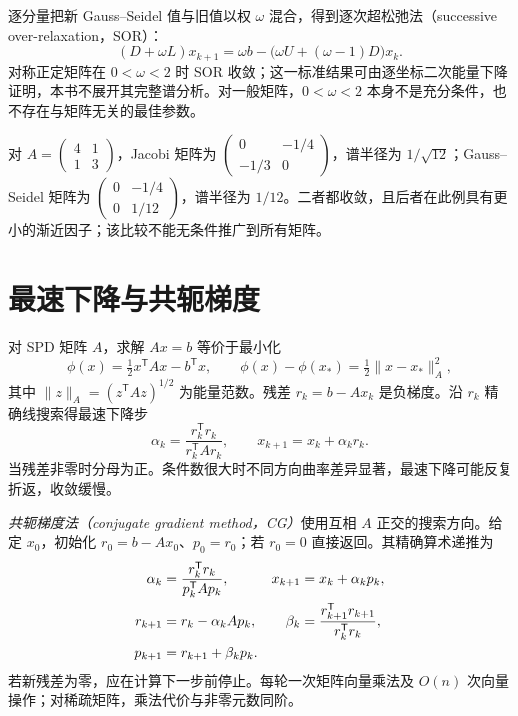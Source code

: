 逐分量把新 Gauss--Seidel 值与旧值以权 $\omega$ 混合，得到逐次超松弛法（successive over-relaxation，SOR）：
\[
 (D+\omega L)x_{k+1}=\omega b-\bigl(\omega U+(\omega-1)D\bigr)x_k.
\]
对称正定矩阵在 $0<\omega<2$ 时 SOR 收敛；这一标准结果可由逐坐标二次能量下降证明，本书不展开其完整谱分析。对一般矩阵，$0<\omega<2$ 本身不是充分条件，也不存在与矩阵无关的最佳参数。

\begin{example}[一个可直接比较的系统]
对 $A=\begin{pmatrix}4&1\\1&3\end{pmatrix}$，Jacobi 矩阵为 $\begin{pmatrix}0&-1/4\\-1/3&0\end{pmatrix}$，谱半径为 $1/\sqrt{12}$；Gauss--Seidel 矩阵为 $\begin{pmatrix}0&-1/4\\0&1/12\end{pmatrix}$，谱半径为 $1/12$。二者都收敛，且后者在此例具有更小的渐近因子；该比较不能无条件推广到所有矩阵。
\end{example}

\section{最速下降与共轭梯度}
对 SPD 矩阵 $A$，求解 $Ax=b$ 等价于最小化
\[
 \phi(x)=\tfrac12x^{\mathsf T}Ax-b^{\mathsf T}x,
 \qquad \phi(x)-\phi(x_*)=\tfrac12\|x-x_*\|_A^2,
\]
其中 $\|z\|_A=(z^{\mathsf T}Az)^{1/2}$ 为能量范数。残差 $r_k=b-Ax_k$ 是负梯度。沿 $r_k$ 精确线搜索得最速下降步
\[
 \alpha_k=\frac{r_k^{\mathsf T}r_k}{r_k^{\mathsf T}Ar_k},\qquad
 x_{k+1}=x_k+\alpha_kr_k.
\]
当残差非零时分母为正。条件数很大时不同方向曲率差异显著，最速下降可能反复折返，收敛缓慢。

\emph{共轭梯度法（conjugate gradient method，CG）}使用互相 $A$ 正交的搜索方向。给定 $x_0$，初始化 $r_0=b-Ax_0$、$p_0=r_0$；若 $r_0=0$ 直接返回。其精确算术递推为
\begin{align}
 \alpha_k&=\frac{r_k^{\mathsf T}r_k}{p_k^{\mathsf T}Ap_k},&
 x_{k+1}&=x_k+\alpha_kp_k,\notag\\
 r_{k+1}&=r_k-\alpha_kAp_k,&
 \beta_k&=\frac{r_{k+1}^{\mathsf T}r_{k+1}}{r_k^{\mathsf T}r_k},\notag\\
 p_{k+1}&=r_{k+1}+\beta_kp_k.
 \label{eq:na-cg}
\end{align}
若新残差为零，应在计算下一步前停止。每轮一次矩阵向量乘法及 $O(n)$ 次向量操作；对稀疏矩阵，乘法代价与非零元数同阶。


